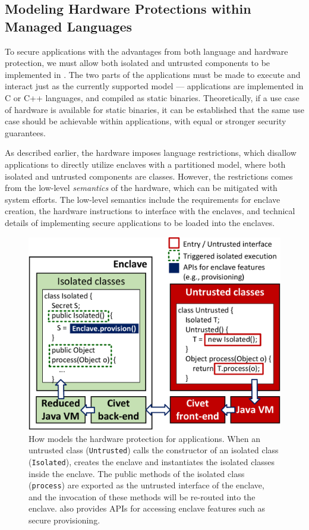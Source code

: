 \subsection{Modeling Hardware Protections within Managed Languages}

To secure applications with the advantages from both \java{} language and \sgx{} hardware protection,
we must allow both isolated and untrusted components to be implemented in \java{}.
The two parts of the applications must be made to execute and interact
just as the currently supported model --- applications are implemented in C or C++ languages,
and compiled as static binaries.
Theoretically, if a use case of \sgx{} hardware is available for static binaries,
it can be established that the same use case
should be achievable within \java{} applications, with equal or stronger security guarantees.

As described earlier,
the \sgx{} hardware imposes language restrictions, which disallow \java{} applications to directly utilize enclaves
with a partitioned model,
where both isolated and untrusted components are \java{} classes.
However, the restrictions comes from the low-level {\em semantics} of
the \sgx{} hardware, which can be mitigated with system efforts.
The low-level semantics include the requirements for enclave creation,
the hardware instructions to interface with the enclaves,
and technical details of implementing secure applications to be loaded into the enclaves.

\begin{figure}[t!]
\centering
\includegraphics[width=0.9\linewidth]{figures/synthesis.pdf}
\footnotesize
\caption{How \sysname{} models the \sgx{} hardware protection for \java{} applications.
When an untrusted class ({\tt Untrusted}) calls the constructor of an isolated class ({\tt Isolated}),
\sysname{} creates the enclave and instantiates the isolated classes
inside the enclave. 
The public methods of the isolated class ({\tt process}) are exported
as the untrusted interface of the enclave, and the invocation of these methods will be re-routed into the enclave.
\sysname{} also provides APIs for accessing enclave features such as secure provisioning.
}
\label{fig:synthesis}
\end{figure}

